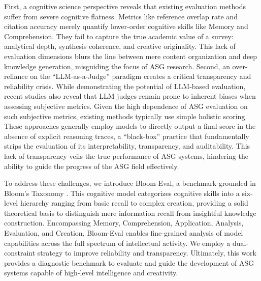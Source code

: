 \documentclass[11pt]{article}
\begin{document}
First, a cognitive science perspective reveals that existing evaluation methods suffer from severe cognitive flatness. Metrics like reference overlap rate \citep{yan2025surveyforge} and citation accuracy \citep{wang2024autosurvey} merely quantify lower-order cognitive skills like Memory and Comprehension. They fail to capture the true academic value of a survey: analytical depth, synthesis coherence, and creative originality. This lack of evaluation dimensions blurs the line between mere content organization and deep knowledge generation, misguiding the focus of ASG research. Second, an over-reliance on the ``LLM-as-a-Judge'' paradigm creates a critical transparency and reliability crisis. While demonstrating the potential of LLM-based evaluation, recent studies \citep{wang2024pandalm, zheng2023judging} also reveal that LLM judges remain prone to inherent biases when assessing subjective metrics. Given the high dependence of ASG evaluation on such subjective metrics, existing methods \citep{wang2024autosurvey, liang2025surveyx} typically use simple holistic scoring. These approaches generally employ models to directly output a final score in the absence of explicit reasoning traces, a ``black-box'' practice that fundamentally strips the evaluation of its interpretability, transparency, and auditability. This lack of transparency veils the true performance of ASG systems, hindering the ability to guide the progress of the ASG field effectively. 

To address these challenges, we introduce Bloom-Eval, a benchmark grounded in Bloom's Taxonomy \citep{anderson2001taxonomy}. This cognitive model categorizes cognitive skills into a six-level hierarchy ranging from basic recall to complex creation, providing a solid theoretical basis to distinguish mere information recall from insightful knowledge construction. Encompassing Memory, Comprehension, Application, Analysis, Evaluation, and Creation, Bloom-Eval enables fine-grained analysis of model capabilities across the full spectrum of intellectual activity. We employ a dual-constraint strategy to improve reliability and transparency. Ultimately, this work provides a diagnostic benchmark to evaluate and guide the development of ASG systems capable of high-level intelligence and creativity.
\end{document}
